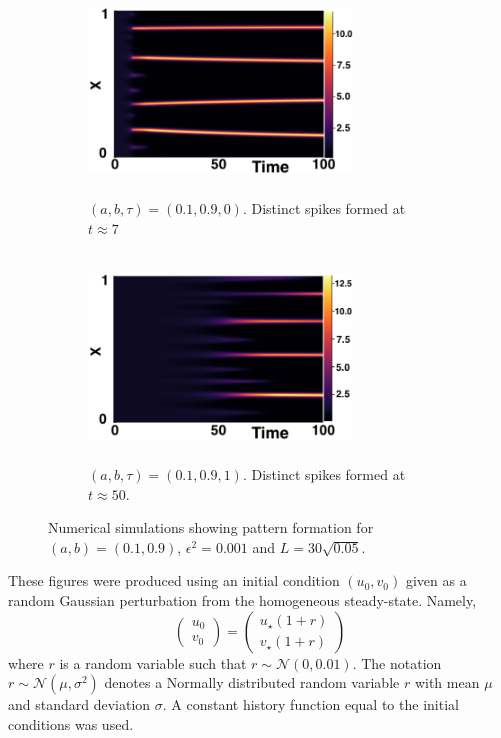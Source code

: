 \begin{figure}[H]
    \centering
    \begin{subfigure}[b]{0.45\textwidth}
        \centering
        \includegraphics[width=7cm,height = 5.5cm]{patt1.png}
        \caption{$(a,b,\tau)=(0.1,0.9,0)$. Distinct spikes formed at $t\approx7$ }
        \label{}
    \end{subfigure}
    \hfill
    \begin{subfigure}[b]{0.45\textwidth}
        \centering
        \includegraphics[width=7cm,height = 5.5cm]{patt2.png}
        \caption{$(a,b,\tau)=(0.1,0.9,1)$. Distinct spikes formed at $t\approx50$.}
        \label{}
    \end{subfigure}
    \caption{Numerical simulations showing pattern formation for $(a,b)=(0.1,0.9)$, $\epsilon^2=0.001$ and $L=30\sqrt{0.05}$.}
    \label{fig:fixedsim2}
\end{figure}
These figures were produced using an initial condition $(u_0,v_0)$ given as a random Gaussian perturbation from the homogeneous steady-state. Namely, $$\begin{pmatrix}u_0\\v_0\end{pmatrix}=\begin{pmatrix}u_\star(1+r)\\v_\star(1+r)\end{pmatrix}$$ where $r$ is a random variable such that $r\sim\mathcal{N}(0,0.01)$. The notation $r\sim\mathcal{N}(\mu,\sigma^2)$ denotes a Normally distributed random variable $r$ with mean $\mu$ and standard deviation $\sigma$. A constant history function equal to the initial conditions was used.
